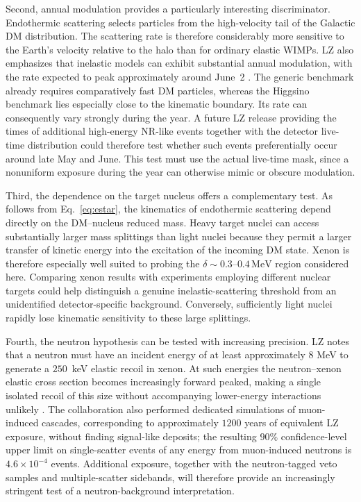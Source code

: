 \documentclass[aps,prd,reprint,superscriptaddress,nofootinbib,longbibliography,floatfix]{revtex4-2}
\begin{document}
Second, annual modulation provides a particularly interesting discriminator. Endothermic scattering selects particles from the high-velocity tail of the Galactic DM distribution. The scattering rate is therefore considerably more sensitive to the Earth's velocity relative to the halo than for ordinary elastic WIMPs. LZ also emphasizes that inelastic models can exhibit substantial annual modulation, with the rate expected to peak approximately around June~2 \cite{LZ2026Extended}. The generic benchmark already requires comparatively fast DM particles, whereas the Higgsino benchmark lies especially close to the kinematic boundary. Its rate can consequently vary strongly during the year. A future LZ release providing the times of additional high-energy NR-like events together with the detector live-time distribution could therefore test whether such events preferentially occur around late May and June. This test must use the actual live-time mask, since a nonuniform exposure during the year can otherwise mimic or obscure modulation.

Third, the dependence on the target nucleus offers a complementary test. As follows from Eq.~\eqref{eq:estar}, the kinematics of endothermic scattering depend directly on the DM--nucleus reduced mass. Heavy target nuclei can access substantially larger mass splittings than light nuclei because they permit a larger transfer of kinetic energy into the excitation of the incoming DM state. Xenon is therefore especially well suited to probing the $\delta\sim0.3$--$0.4\,\mathrm{MeV}$ region considered here. Comparing xenon results with experiments employing different nuclear targets could help distinguish a genuine inelastic-scattering threshold from an unidentified detector-specific background. Conversely, sufficiently light nuclei rapidly lose kinematic sensitivity to these large splittings.

Fourth, the neutron hypothesis can be tested with increasing precision. LZ notes that a neutron must have an incident energy of at least approximately $8$ MeV to generate a $250\,$ keV elastic recoil in xenon. At such energies the neutron--xenon elastic cross section becomes increasingly forward peaked, making a single isolated recoil of this size without accompanying lower-energy interactions unlikely \cite{LZ2026Extended}. The collaboration also performed dedicated simulations of muon-induced cascades, corresponding to approximately $1200$ years of equivalent LZ exposure, without finding signal-like deposits; the resulting $90\%$ confidence-level upper limit on single-scatter events of any energy from muon-induced neutrons is $4.6\times 10^{-4}$ events. Additional exposure, together with the neutron-tagged veto samples and multiple-scatter sidebands, will therefore provide an increasingly stringent test of a neutron-background interpretation.
\end{document}
